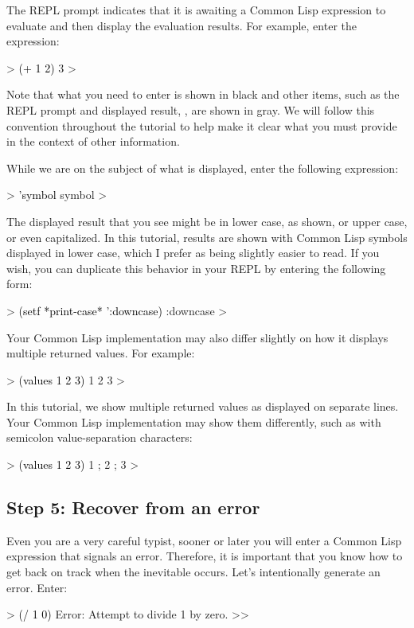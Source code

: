 \documentclass[10pt,twoside,english,pdftex]{article}
\begin{document}
The REPL prompt indicates that it is awaiting a Common Lisp expression to
evaluate and then display the evaluation results. For example, enter the
expression:
%
\begin{example}\color{darkergray}%
  > \textcolor{black}{(+ 1 2)}
  3
  >
\end{example}
%
Note that what you need to enter is shown in black and other items, such as
the REPL prompt and displayed result, , are shown in gray.  We will
follow this convention throughout the tutorial to help make it clear what you
must provide in the context of other information.

%
While we are on the subject of what is displayed, enter the following expression:
%
\begin{example}\color{darkergray}%
  > \textcolor{black}{'symbol}
  symbol
  >
\end{example}
%
The displayed result that you see might be in lower case, as shown, or upper
case, or even capitalized.  In this tutorial, results are shown with Common
Lisp symbols displayed in lower case, which I prefer as being slightly easier
to read.  If you wish, you can duplicate this behavior in your REPL by
entering the following form:
%
\begin{example}\color{darkergray}%
  > \textcolor{black}{(setf *print-case* ':downcase)}
  :downcase
  >
\end{example}

%
Your Common Lisp implementation may also differ slightly on how it displays
multiple returned values.  For example:
%
\begin{example}\color{darkergray}%
  > \textcolor{black}{(values 1 2 3)}
  1
  2
  3
  >
\end{example}
%
In this tutorial, we show multiple returned values as displayed on separate
lines.  Your Common Lisp implementation may show them differently, such as
with semicolon value-separation characters:
%
\begin{example}\color{darkergray}%
  > \textcolor{black}{(values 1 2 3)}
  1 ;
  2 ;
  3
  >
\end{example}

\subsection*{Step 5: Recover from an error}

%
%
Even you are a very careful typist, sooner or later you will enter a Common
Lisp expression that signals an error.  Therefore, it is important that you
know how to get back on track when the inevitable occurs.  Let's intentionally
generate an error.  Enter:
%
\begin{example}\color{darkergray}%
  > \textcolor{black}{(/ 1 0)}
  Error: Attempt to divide 1 by zero.
  >>
\end{example}
\end{document}
